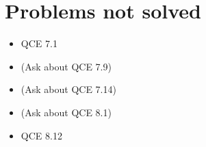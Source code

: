 \documentclass[10pt]{article}
\begin{document}
\section*{Problems not solved}
\begin{itemize}
\item QCE 7.1 
\item (Ask about QCE 7.9)
\item (Ask about QCE 7.14)
\item (Ask about QCE 8.1)
\item QCE 8.12
\end{itemize}
\end{document}
